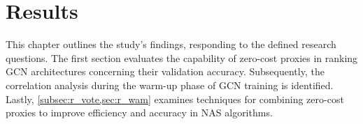 \chapter{Results}\label{results}

This chapter outlines the study's findings, responding to the defined research questions. The first section evaluates the capability of zero-cost proxies in ranking \gls{GCN} architectures concerning their validation accuracy. Subsequently, the correlation analysis during the warm-up phase of \gls{GCN} training is identified. Lastly, \cref{subsec:r_vote,sec:r_wam} examines techniques for combining zero-cost proxies to improve efficiency and accuracy in \gls{NAS} algorithms.









%

